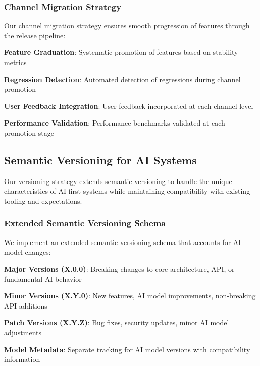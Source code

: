 \subsubsection*{Channel Migration Strategy}

Our channel migration strategy ensures smooth progression of features through the release pipeline:

\begin{compactlist}
    \item \textbf{Feature Graduation}: Systematic promotion of features based on stability metrics
    \item \textbf{Regression Detection}: Automated detection of regressions during channel promotion
    \item \textbf{User Feedback Integration}: User feedback incorporated at each channel level
    \item \textbf{Performance Validation}: Performance benchmarks validated at each promotion stage
\end{compactlist}

\subsection*{Semantic Versioning for AI Systems}

Our versioning strategy extends semantic versioning to handle the unique characteristics of AI-first systems while maintaining compatibility with existing tooling and expectations.

\subsubsection*{Extended Semantic Versioning Schema}

We implement an extended semantic versioning schema that accounts for AI model changes:

\begin{expandedlist}
    \item \textbf{Major Versions (X.0.0)}: Breaking changes to core architecture, API, or fundamental AI behavior
    \item \textbf{Minor Versions (X.Y.0)}: New features, AI model improvements, non-breaking API additions
    \item \textbf{Patch Versions (X.Y.Z)}: Bug fixes, security updates, minor AI model adjustments
    \item \textbf{Model Metadata}: Separate tracking for AI model versions with compatibility information
\end{expandedlist}

